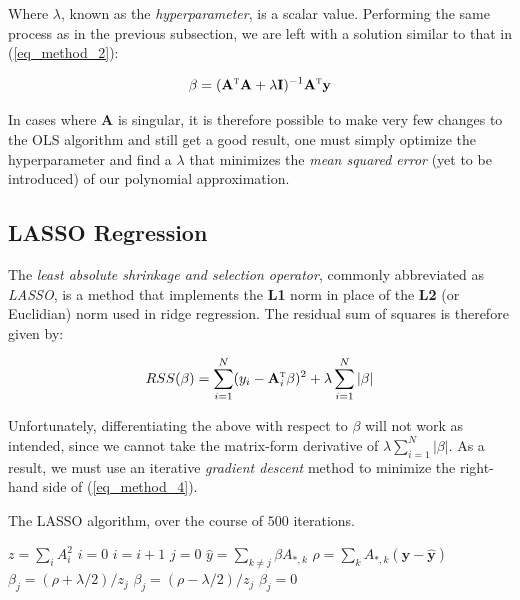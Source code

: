 \documentclass[a4paper,10pt,english]{article}
\begin{document}
	Where $\lambda$, known as the \textit{hyperparameter}, is a scalar value. Performing the same process as in the previous subsection, we are left with a solution similar to that in (\ref{eq_method_2}):
	
	\begin{equation}
	\label{eq_method_3}
	\beta = (\mathbf{A}^\textsc{t} \mathbf{A} + \lambda \mathbf{I}) ^{-1} \mathbf{A}^\textsc{t} \mathbf{y}
	\end{equation}
	
	In cases where $\mathbf{A}$ is singular, it is therefore possible to make very few changes to the OLS algorithm and still get a good result, one must simply optimize the hyperparameter and find a $\lambda$ that minimizes the \textit{mean squared error} (yet to be introduced) of our polynomial approximation.
	
	\subsection*{LASSO Regression}
	
	The \textit{least absolute shrinkage and selection operator}, commonly abbreviated as \textit{LASSO}, is a method that implements the \textbf{L1} norm in place of the \textbf{L2} (or Euclidian) norm used in ridge regression.  The residual sum of squares is therefore given by:
	
	\begin{equation}
	\label{eq_method_4}
	RSS(\beta) = \sum_{i=1}^N (y_i - \mathbf{A}_i^\textsc{t} \beta)^2 + \lambda \sum_{i=1}^N |\beta|
	\end{equation}
	
	Unfortunately, differentiating the above with respect to $\beta$ will not work as intended, since we cannot take the matrix-form derivative of $\lambda \sum_{i=1}^N |\beta|$.  As a result, we must use an iterative \textit{gradient descent} method to minimize the right-hand side of (\ref{eq_method_4}).
	
	\begin{algorithm}[H]
		\caption{The LASSO algorithm, over the course of $500$ iterations.}
		\begin{algorithmic}[1]
			\State $z = \sum_i A_i^2$
			\State $i = 0$
				\State $i = i + 1$
				\State $j = 0$
				\While{j < p}
					\State $\hat{y} = \sum_{k \neq j} \beta A_{*,k}$
					\State $\rho = \sum_k A_{*,k} (\mathbf{y} - \mathbf{\hat{y}})$
						\State $\beta_j = (\rho + \lambda/2)/z_j$
						\State $\beta_j = (\rho - \lambda/2)/z_j$
					\Else
						\State $\beta_j = 0$
					\EndIf
				\EndWhile		
			\EndWhile
		\end{algorithmic}
	\end{algorithm}
	
\end{document}
